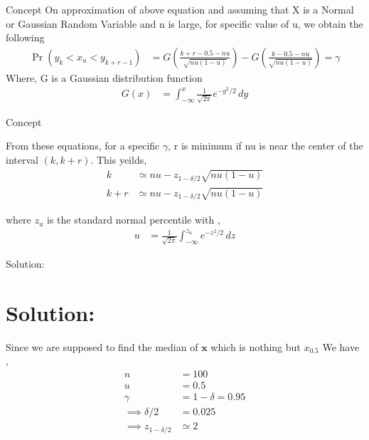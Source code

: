 \documentclass{beamer}
\providecommand{\pr}[1]{\ensuremath{\Pr\left(#1\right)}}
\theoremstyle{remark}
\numberwithin{equation}{subsection}
\let\vec\mathbf
\begin{document}
\begin{frame}{Concept}
    On approximation of above equation and assuming that X is a Normal or Gaussian Random Variable and n is large, for specific value of u,
    we obtain the following
    \begin{align}
        \pr{y_k < x_u < y_{k+r-1}} &= G(\frac{k + r - 0.5 - nu}{\sqrt{nu(1-u)}}) - G(\frac{k - 0.5 - nu}{\sqrt{nu(1-u)}}) = \gamma
     \end{align}
     Where, G is a Gaussian distribution function
     \begin{align}
         G(x) &= \int_{-\infty}^{x} \frac{1}{\sqrt{2\pi}} e^{-y^2/2} \, dy
     \end{align}
\end{frame}

\begin{frame}{Concept}

    From these equations, for a specific $\gamma$, r is minimum if nu is near the center of the interval $(k, k+r)$. This yeilds,
    \begin{align}
        k &\simeq nu-z_{1-\delta/2}\sqrt{nu(1-u)} \\
        k+r &\simeq nu-z_{1-\delta/2}\sqrt{nu(1-u)} 
    \end{align}
    
    where $z_u$ is the standard normal percentile with ,
\begin{align}
    u &= \frac{1}{\sqrt{2\pi}} \int_{-\infty}^{z_u} e^{-z^2/2} \, dz
\end{align}
\end{frame}

\begin{frame}{Solution:}

    \section{Solution:}
    Since we are supposed to find the median of $\vec{x}$ which is nothing but $x_{0.5}$ We have ,
    \begin{align}
        n &= 100 \\
        u &= 0.5 \\
        \gamma &= 1-\delta = 0.95 \\
        \implies \delta/2 &= 0.025\\
        \implies z_{1-\delta/2} &\simeq 2
    \end{align}
\end{frame}
\end{document}
